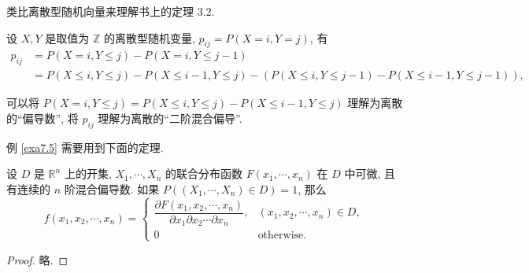 \documentclass{ctexart}
\begin{document}
类比离散型随机向量来理解书上的定理 3.2.
\begin{example}
    设 $X,Y$ 是取值为 $\mathbb{Z}$ 的离散型随机变量, $p_{ij}=P(X=i,Y=j)$, 有
    \begin{align*}
        p_{ij} & =P(X=i,Y\leq j)-P(X=i,Y\leq j-1) \\
        & =P(X\leq i,Y\leq j)-P(X\leq i-1,Y\leq j)-(P(X\leq i,Y\leq j-1)-P(X\leq i-1,Y\leq j-1)),
    \end{align*}

    可以将 $P(X=i,Y\leq j)=P(X\leq i,Y\leq j)-P(X\leq i-1,Y\leq j)$ 理解为离散的``偏导数'', 将 $p_{ij}$ 理解为离散的``二阶混合偏导''.
\end{example}

例 \ref{exa7.5} 需要用到下面的定理.
\begin{theorem}\label{t7.2}
    设 $D$ 是 $\mathbb{R}^n$ 上的开集, $X_1,\cdots,X_n$ 的联合分布函数 $F(x_1,\cdots,x_n)$ 在 $D$ 中可微, 且有连续的 $n$ 阶混合偏导数. 如果 $P((X_1,\cdots,X_n)\in D)=1$, 那么
    \[f(x_1,x_2,\cdots,x_n)=\begin{cases}
        \dfrac{\partial F(x_1,x_2,\cdots,x_n)}{\partial x_1\partial x_2\cdots\partial x_n}, & (x_1,x_2,\cdots,x_n)\in D, \\
        0 & \text{otherwise}.
    \end{cases}\]
\end{theorem}
\begin{proof}
    略.
\end{proof}
\end{document}

